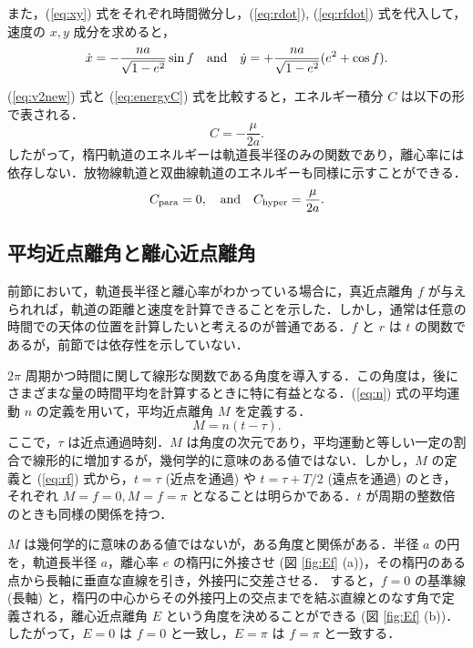 \documentclass[11pt,a4paper,oneside,onecolumn]{jreport}
\begin{document}
また，(\ref{eq:xy}) 式をそれぞれ時間微分し，(\ref{eq:rdot}),  (\ref{eq:rfdot}) 式を代入して，速度の $x, y$ 成分を求めると，
\begin{equation}
\dot{x} = - \frac{n a}{\sqrt{1 - e^2}} \sin f \quad {\rm and} \quad  \dot{y} = + \frac{n a}{\sqrt{1 - e^2}} (e^2 + \cos f). \label{eq:xdotydot}
\end{equation}

(\ref{eq:v2new}) 式と (\ref{eq:energyC}) 式を比較すると，エネルギー積分 $C$ は以下の形で表される．
\begin{equation}
C = - \frac{\mu}{2 a}. \label{eq:C}
\end{equation}
したがって，楕円軌道のエネルギーは軌道長半径のみの関数であり，離心率には依存しない．放物線軌道と双曲線軌道のエネルギーも同様に示すことができる．
\begin{equation}
C_{{\rm para}} = 0, \quad {\rm and} \quad C_{{\rm hyper}} = \frac{\mu}{2 a}.
\end{equation}

\subsection{平均近点離角と離心近点離角}
前節において，軌道長半径と離心率がわかっている場合に，真近点離角 $f$ が与えられれば，軌道の距離と速度を計算できることを示した．しかし，通常は任意の時間での天体の位置を計算したいと考えるのが普通である．$f$ と $r$ は $t$ の関数であるが，前節では依存性を示していない．

$2 \pi$ 周期かつ時間に関して線形な関数である角度を導入する．この角度は，後にさまざまな量の時間平均を計算するときに特に有益となる．(\ref{eq:n}) 式の平均運動 $n$ の定義を用いて，平均近点離角 $M$ を定義する．
\begin{equation}
M = n (t - \tau). \label{eq:M}
\end{equation}
ここで，$\tau$ は近点通過時刻．$M$ は角度の次元であり，平均運動と等しい一定の割合で線形的に増加するが，幾何学的に意味のある値ではない．しかし，$M$ の定義と (\ref{eq:rf}) 式から，$t = \tau$ (近点を通過) や $t = \tau + T / 2$ (遠点を通過) のとき，それぞれ $M = f =0, M = f = \pi$ となることは明らかである．$t$ が周期の整数倍のときも同様の関係を持つ．

$M$ は幾何学的に意味のある値ではないが，ある角度と関係がある．半径 $a$ の円を，軌道長半径 $a$，離心率 $e$ の楕円に外接させ (図 \ref{fig:Ef} (a))，その楕円のある点から長軸に垂直な直線を引き，外接円に交差させる． すると，$f = 0$ の基準線 (長軸) と，楕円の中心からその外接円上の交点までを結ぶ直線とのなす角で定義される，離心近点離角 $E$ という角度を決めることができる (図 \ref{fig:Ef} (b))．したがって，$E = 0$ は $f = 0$ と一致し，$E = \pi$ は $f = \pi$ と一致する．
\end{document}
